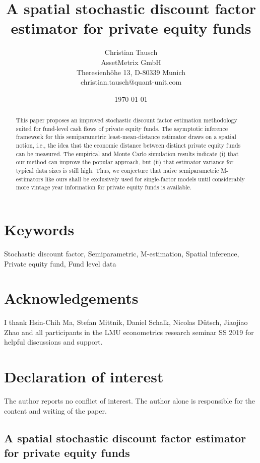 \documentclass[12pt]{article}
\title{A spatial stochastic discount factor estimator for private equity funds}
\author{
	Christian Tausch  \\
	AssetMetrix GmbH  \\
	Theresienh\"{o}he 13, D-80339 Munich \\
	christian.tausch@quant-unit.com \\
	}
\date{\today}
\begin{document}
\maketitle


\section*{Keywords}
Stochastic discount factor, Semiparametric, M-estimation, Spatial inference, Private equity fund, Fund level data


\section*{Acknowledgements}
I thank Hsin-Chih Ma, Stefan Mittnik, Daniel Schalk, Nicolas D\"{u}tsch, Jiaojiao Zhao and all participants in the LMU econometrics research seminar SS 2019 for helpful discussions and support.


\section*{Declaration of interest}
The author reports no conflict of interest. 
The author alone is responsible for the content and writing of the paper.


\newpage
\doublespacing

\begin{center} 
\section*{A spatial stochastic discount factor estimator for private equity funds}
\end{center}



\begin{abstract}
This paper proposes an improved stochastic discount factor estimation methodology suited for fund-level cash flows of private equity funds.
The asymptotic inference framework for this semiparametric least-mean-distance estimator draws on a spatial notion, i.e., the idea that the economic distance between distinct private equity funds can be measured.
The empirical and Monte Carlo simulation results indicate (i) that our method can improve the popular \cite{DLP12} approach, but (ii) that estimator variance for typical data sizes is still high.
Thus, we conjecture that naive semiparametric M-estimators like ours shall be exclusively used for single-factor models until considerably more vintage year information for private equity funds is available.
\end{abstract}
\end{document}
